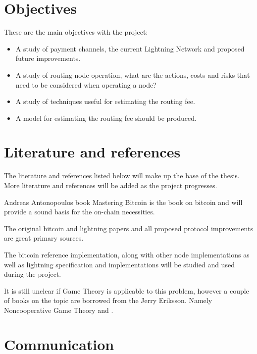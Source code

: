 \documentclass[10pt, titlepage, oneside, a4paper]{article}
\begin{document}
\section{Objectives}

These are the main objectives with the project:

\begin{itemize}
	\item A study of payment channels, the current Lightning Network and
	proposed future improvements.
	\item A study of routing node operation, what are the actions, costs and risks
	that need to be considered when operating a node?
	\item A study of techniques useful for estimating the routing fee.
	\item A model for estimating the routing fee should be produced.
\end{itemize}

\section{Literature and references}

The literature and references listed below will make up the base of the thesis. More literature and references will be added as the project progresses. 

Andreas Antonopoulos book Mastering Bitcoin\cite{antonopoulos:mastering:bitcoin} is the book on bitcoin and will provide a sound basis for the on-chain necessities.

The original bitcoin\cite{nakamoto:bitcoin} and lightning\cite{poon:dryja:lightning:network} papers and all proposed protocol improvements\cite{bip} are great primary sources.

The bitcoin reference implementation\cite{repository:bitcoin}, along with other node implementations\cite{repository:neutrino}\cite{repository:btcd} as well as lightning specification\cite{repository:lightning:rfc} and implementations\cite{repository:lnd}\cite{repository:clightning}\cite{repository:eclair} will be studied and used during the project.

It is still unclear if Game Theory is applicable to this problem, however a couple of books on the topic are borrowed from the Jerry Eriksson. Namely Noncooperative Game Theory\cite{hespanha:noncooperative:game:theory} and \cite{lasaulce:tembine:game:theory:and:learning:for:wireless:networks}.

\section{Communication}
\end{document}
